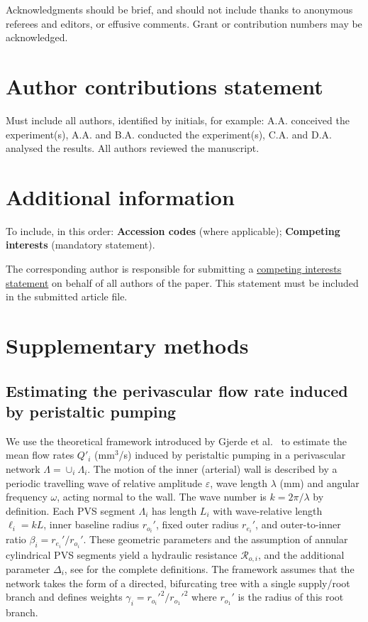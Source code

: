 \documentclass[fleqn,10pt]{wlscirep}
\begin{document}
Acknowledgments should be brief, and should not include thanks to anonymous referees and editors, or effusive comments. Grant or contribution numbers may be acknowledged.

\section*{Author contributions statement}

Must include all authors, identified by initials, for example:
A.A. conceived the experiment(s),  A.A. and B.A. conducted the experiment(s), C.A. and D.A. analysed the results.  All authors reviewed the manuscript. 

\section*{Additional information}

To include, in this order: \textbf{Accession codes} (where applicable); \textbf{Competing interests} (mandatory statement). 

The corresponding author is responsible for submitting a \href{http://www.nature.com/srep/policies/index.html#competing}{competing interests statement} on behalf of all authors of the paper. This statement must be included in the submitted article file.


\newpage
\appendix

\section{Supplementary methods}

\subsection{Estimating the perivascular flow rate induced by peristaltic pumping}
\label{sec:sup:peristalsis}

We use the theoretical framework introduced by Gjerde et
al.~\cite{gjerde2023directional} to estimate the mean flow rates
$Q'_i$ (mm$^3$/s) induced by peristaltic pumping in a perivascular
network $\Lambda = \cup_i \Lambda_i$. The motion of the inner
(arterial) wall is described by a periodic travelling wave of relative
amplitude $\varepsilon$, wave length $\lambda$ (mm) and angular
frequency $\omega$, acting normal to the wall. The wave number is $k =
2 \pi / \lambda$ by definition. Each PVS segment $\Lambda_i$ has
length $L_i$ with wave-relative length $\ell_i = k L$, inner baseline
radius $r_{o_i}'$, fixed outer radius $r_{e_i}'$, and outer-to-inner
ratio $\beta_i = r_{e_i}'/r_{o_i}'$. These geometric parameters and
the assumption of annular cylindrical PVS segments yield a hydraulic
resistance $\mathcal{R}_{o, i}$, and the additional parameter
$\Delta_i$, see \cite{gjerde2023directional} for the complete
definitions. The framework assumes that the network takes the form of
a directed, bifurcating tree with a single supply/root branch and
defines weights $\gamma_i = r_{o_i}'^2/r_{o_1}'^2$ where $r_{o_1}'$ is
the radius of this root branch.
\end{document}
